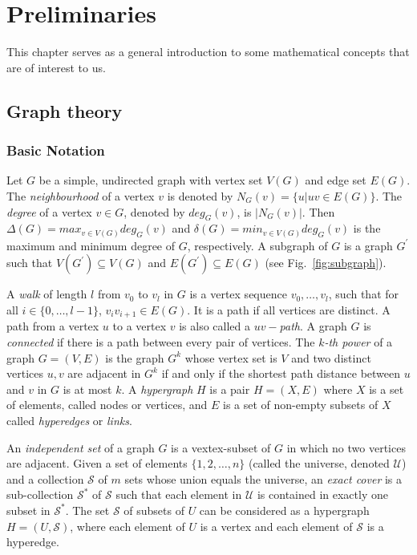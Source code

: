 \chapter{Preliminaries}
\label{chap:preliminaries}
This chapter serves as a general introduction to some mathematical concepts that are of interest to us.
\section{Graph theory}

\subsection{Basic Notation}
Let $G$ be a simple, undirected graph with vertex set $V(G)$ and edge set $E(G)$. The \textit{neighbourhood} of a vertex $v$ is denoted by
$N_{G}(v) = \{u | uv \in E(G)\}$. The \textit{degree} of a vertex $v \in G$, denoted by $deg_{G}(v)$, is $|N_{G}(v)|$. Then
$\Delta(G) = max_{v \in V(G)} deg_{G}(v)$ and $\delta(G) = min_{v \in V(G)} deg_{G}(v) $ is the maximum and minimum degree of $G$, respectively.
A subgraph of $G$ is a graph $G^{'}$ such that $V(G^{'}) \subseteq V(G)$ and $E(G^{'}) \subseteq E(G)$ (see Fig.~\ref{fig:subgraph}).

A \textit{walk} of length $l$ from $v_0$ to $v_l$ in $G$ is a vertex sequence $v_0, \dots ,v_{l}$, such that for all
$i \in \{0,\dots,l-1\}$, $v_{i}v_{i+1} \in E(G)$. It is a path if all vertices are distinct. A path from a vertex $u$ to a vertex $v$ is also
called a \textit{$uv-$path}. A graph $G$ is \textit{connected} if there is a path between every pair of vertices. The \textit{$k$-th power} of
a graph $G = (V,E)$ is the graph $G^{k}$ whose vertex set is $V$ and two distinct vertices $u,v$ are adjacent in $G^{k}$ if and only if the
shortest path distance between $u$ and $v$ in $G$ is at most $k$.
A \textit{hypergraph} $H$ is a pair $H = (X,E)$ where $X$ is a set of elements, called nodes or vertices, and $E$ is a set of non-empty subsets of $X$
called \textit{hyperedges} or \textit{links}.

An \textit{independent set} of a graph $G$ is a vextex-subset of $G$ in which
no two vertices are adjacent. Given a set of elements $\{1,2,\dots,n\}$ (called the universe, denoted $\mathcal{U}$) and a
collection $\mathcal{S}$ of $m$ sets whose union equals the universe, an \textit{exact cover} is a sub-collection $\mathcal{S}^{*}$ of $\mathcal{S}$
such that each element in $\mathcal{U}$ is contained in exactly one subset in $\mathcal{S}^{*}$. The set $\mathcal{S}$ of subsets of $U$ can be
considered as a hypergraph $H = (U, \mathcal{S})$, where each element of $U$ is a vertex and each element of $\mathcal{S}$ is a hyperedge.


